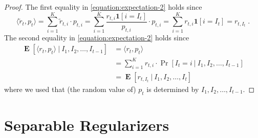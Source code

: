 \documentclass[12pt]{article}
\newcommand{\indicator}{\mathbf{1}}
\DeclareMathOperator{\Exp}{\mathbf{E}}
\begin{document}
\begin{proof}
The first equality in \eqref{equation:expectation-2} holds since
$$
\langle \widetilde r_t, p_t \rangle
= \sum_{i=1}^K \widetilde r_{t,i} \cdot p_{t,i}
= \sum_{i=1}^K \frac{r_{t,i} \indicator[i=I_t]}{p_{t,i}} \cdot p_{t,i}
= \sum_{i=1}^K r_{t,i} \indicator[i=I_t]
= r_{t,I_t} \; .
$$
The second equality in \eqref{equation:expectation-2} holds since
\begin{align*}
\Exp\left[ \langle r_t, p_t \rangle ~|~ I_1, I_2, \dots, I_{t-1} \right]
& = \langle r_t, p_t \rangle \\
& = \sum_{i=1}^K r_{t,i} \cdot \Pr\left[ I_t = i ~|~ I_1, I_2, \dots, I_{t-1} \right] \\
& = \Exp\left[r_{t,I_t} ~|~ I_1, I_2, \dots, I_t \right]
\end{align*}
where we used that (the random value of) $p_t$ is determined by $I_1, I_2, \dots, I_{t-1}$.
\end{proof}

\section{Separable Regularizers}
\end{document}
